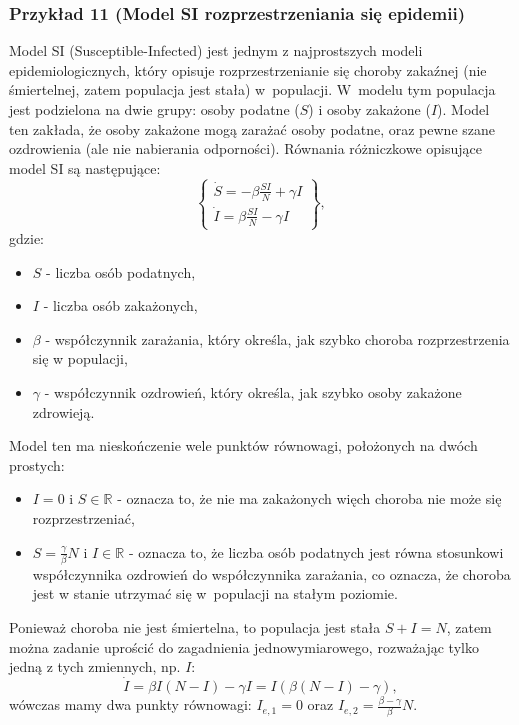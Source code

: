 \documentclass{article}
\begin{document}
    \subsubsection{Przykład 11 (Model SI rozprzestrzeniania się epidemii)}
    Model SI (Susceptible-Infected) jest jednym z najprostszych modeli
    epidemiologicznych, który opisuje rozprzestrzenianie się choroby zakaźnej
    (nie śmiertelnej, zatem populacja jest stała) w~populacji. W~modelu tym populacja jest podzielona na dwie grupy:
    osoby podatne ($S$) i osoby zakażone ($I$). Model ten zakłada, że osoby zakażone
    mogą zarażać osoby podatne, oraz pewne szane ozdrowienia (ale nie nabierania
    odporności).
    Równania różniczkowe opisujące model SI są następujące:
    \begin{equation}
        \label{eq:si_model}
        \left\{
        \begin{array}{l}
             \dot{S} = -\beta \frac{SI}{N} + \gamma I\\
             \dot{I} = \beta \frac{SI}{N} - \gamma I
        \end{array}
        \right\},
    \end{equation}
    gdzie:
    \begin{itemize}
        \item $S$ - liczba osób podatnych,
        \item $I$ - liczba osób zakażonych,
        \item $\beta$ - współczynnik zarażania, który określa, jak szybko choroba rozprzestrzenia się w populacji,
        \item $\gamma$ - współczynnik ozdrowień, który określa, jak szybko osoby zakażone zdrowieją.
    \end{itemize}
    Model ten ma nieskończenie wele punktów równowagi, położonych na dwóch
    prostych:
    \begin{itemize}
        \item $I=0$ i $S \in \mathbb{R}$ - oznacza to, że nie ma zakażonych
        więch choroba nie może się rozprzestrzeniać,
        \item $S = \frac{\gamma}{\beta}N$ i $I \in \mathbb{R}$ - oznacza to, że
        liczba osób podatnych jest równa stosunkowi współczynnika ozdrowień do
        współczynnika zarażania, co oznacza, że choroba jest w stanie utrzymać
        się w~populacji na stałym poziomie.
    \end{itemize}
    Ponieważ choroba nie jest śmiertelna, to populacja jest stała $S+I=N$,
    zatem można zadanie uprościć do zagadnienia jednowymiarowego,
    rozważając tylko jedną z tych zmiennych, np. $I$:
    \begin{equation}
    \label{eq:si_model_reduced}
        \dot{I} = \beta I(N - I) - \gamma I = I(\beta (N - I) - \gamma),
    \end{equation}
    wówczas mamy dwa punkty równowagi: $I_{e,1} = 0$ oraz $I_{e,2} =
    \frac{\beta-\gamma}{\beta}N$.
    
\end{document}
